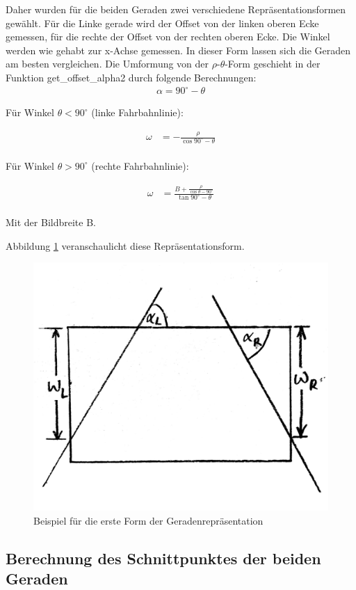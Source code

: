 	Daher wurden für die beiden Geraden zwei verschiedene Repräsentationsformen gewählt. Für die Linke gerade wird der Offset von der linken oberen Ecke gemessen, für die rechte der Offset von der rechten oberen Ecke. Die Winkel werden wie gehabt zur x-Achse gemessen. In dieser Form lassen sich die Geraden am besten vergleichen. Die Umformung von der $\rho$-$\theta$-Form geschieht in der Funktion get\_offset\_alpha2 durch folgende Berechnungen: \\
	
	\begin{align*}
	\alpha=90^{\circ}-\theta
	\end{align*}
	
	
	Für Winkel $\theta<90^\circ$ (linke Fahrbahnlinie):
	
	\begin{align*}
	\omega&=-\frac{\rho}{\cos{90^{\circ}-\theta}} \\
	\end{align*}
	
	Für Winkel $\theta>90^\circ$ (rechte Fahrbahnlinie):
	
	\begin{align*}
	\omega&=\frac{B+\frac{\rho}{\cos{\theta-90^{\circ}}}}{\tan{90^{\circ}-\theta}} \\
	\end{align*}
	
	Mit der Bildbreite B.
	
	Abbildung \ref{fig:alpha_omega3} veranschaulicht diese Repräsentationsform.
	
		\begin{figure}[H]
		\centering
		\includegraphics[width=.5\linewidth]{images/alpha_omega3.jpg}
		\caption{Beispiel für die erste Form der Geradenrepräsentation}
		\label{fig:alpha_omega3}
	\end{figure}


	\subsection{Berechnung des Schnittpunktes der beiden Geraden}
	
